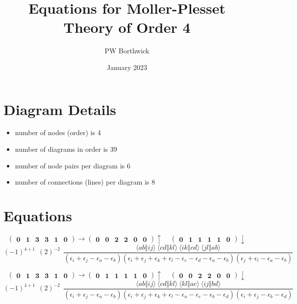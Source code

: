 \documentclass[12pt,oneside,a4paper,fleqn]{article}
\begin{document}
\title{Equations for Moller-Plesset Theory of Order 4}
\author{PW Borthwick}
\date{January 2023}
\maketitle

\section{Diagram Details}
\begin{itemize}
\item number of nodes (order) is 4
\item number of diagrams in order is 39
\item number of node pairs per diagram is 6
\item number of connections (lines) per diagram is 8
\end{itemize}

\section{Equations}
\normalsize

\[ \boldsymbol{ \begin{pmatrix} 0 & 1 & 3 & 3 & 1 & 0 \end{pmatrix} \rightarrow \begin{pmatrix} 0 & 0 & 2 & 2 & 0 & 0 \end{pmatrix} \uparrow~~~~~\begin{pmatrix} 0 & 1 & 1 & 1 & 1 & 0 \end{pmatrix} \downarrow } \]
$$(-1)^{4+1}~~(2)^{-2}~~\frac{\langle ab \Vert ij \rangle ~\langle cd \Vert kl \rangle ~\langle ik \Vert cd \rangle ~\langle jl \Vert ab \rangle }{(\epsilon_i +\epsilon_j -\epsilon_a -\epsilon_b ) (\epsilon_i +\epsilon_j +\epsilon_k +\epsilon_l -\epsilon_c -\epsilon_d -\epsilon_a -\epsilon_b ) (\epsilon_j +\epsilon_l -\epsilon_a -\epsilon_b ) }$$

\[ \boldsymbol{ \begin{pmatrix} 0 & 1 & 3 & 3 & 1 & 0 \end{pmatrix} \rightarrow \begin{pmatrix} 0 & 1 & 1 & 1 & 1 & 0 \end{pmatrix} \uparrow~~~~~\begin{pmatrix} 0 & 0 & 2 & 2 & 0 & 0 \end{pmatrix} \downarrow } \]
$$(-1)^{4+1}~~(2)^{-2}~~\frac{\langle ab \Vert ij \rangle ~\langle cd \Vert kl \rangle ~\langle kl \Vert ac \rangle ~\langle ij \Vert bd \rangle }{(\epsilon_i +\epsilon_j -\epsilon_a -\epsilon_b ) (\epsilon_i +\epsilon_j +\epsilon_k +\epsilon_l -\epsilon_a -\epsilon_c -\epsilon_b -\epsilon_d ) (\epsilon_i +\epsilon_j -\epsilon_b -\epsilon_d ) }$$
\end{document}
